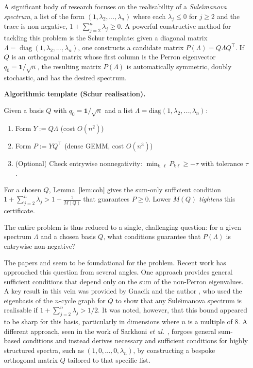 \documentclass[12pt,fleqn]{amsart}
\renewcommand{\le}{\leqslant}
\renewcommand{\ge}{\geqslant}
\theoremstyle{definition}
\theoremstyle{remark}
\newcommand{\1}{\mathbf{1}}
\begin{document}
A significant body of research focuses on the realisability of a \emph{Sule\u{\i}manova spectrum}, a list of the form $(1, \lambda_2, \dots, \lambda_n)$ where each $\lambda_j \le 0$ for $j \ge 2$ and the trace is non-negative, $1 + \sum_{j=2}^n \lambda_j \ge 0$. A powerful constructive method for tackling this problem is the Schur template: given a diagonal matrix $\Lambda = \operatorname{diag}(1, \lambda_2, \dots, \lambda_n)$, one constructs a candidate matrix $P(\Lambda) = Q\Lambda Q^\top$. If $Q$ is an orthogonal matrix whose first column is the Perron eigenvector $q_0 = \mathbf{1}/\sqrt{n}$, the resulting matrix $P(\Lambda)$ is automatically symmetric, doubly stochastic, and has the desired spectrum. 
\medskip

\noindent\textbf{Algorithmic template (Schur realisation).}

Given a basis $Q$ with $q_0=\1/\sqrt n$ and a list $\Lambda=\mathrm{diag}(1,\lambda_2,\ldots,\lambda_n)$:
\begin{enumerate}[leftmargin=*,itemsep=1pt]
\item Form $Y:=Q\Lambda$ \hfill (cost $O(n^2)$)
\item Form $P:=YQ^\top$ \hfill (dense GEMM, cost $O(n^3)$)
\item (Optional) Check entrywise nonnegativity: $\min_{k,\ell}P_{k\ell}\ge -\tau$ with tolerance $\tau$.
\end{enumerate}
For a chosen $Q$, Lemma~\ref{lem:coh} gives the sum-only sufficient condition $1+\sum_{j=2}^n\lambda_j>1-\tfrac{1}{M(Q)}$ that guarantees $P\ge0$. Lower $M(Q)$ \emph{tightens} this certificate.
\medskip

The entire problem is thus reduced to a single, challenging question: for a given spectrum $\Lambda$ and a chosen basis $Q$, what conditions guarantee that $P(\Lambda)$ is entrywise non-negative?\smallskip

The papers \cite{Perfect} and \cite{PM65} seem to be foundational for the problem. Recent work has approached this question from several angles. One approach provides general sufficient conditions that depend only on the sum of the non-Perron eigenvalues. A key result in this vein was provided by Gnacik and the author \cite{GK20}, who used the eigenbasis of the $n$-cycle graph for $Q$ to show that any Sule\u{\i}manova spectrum is realisable if $1 + \sum_{j=2}^n \lambda_j > 1/2$. It was noted, however, that this bound appeared to be sharp for this basis, particularly in dimensions where $n$ is a multiple of 8. A different approach, seen in the work of Sarkhoni \emph{et al}.~\cite{Sarkhoni25}, forgoes general sum-based conditions and instead derives necessary and sufficient conditions for highly structured spectra, such as $(1, 0, \dots, 0, \lambda_n)$, by constructing a bespoke orthogonal matrix $Q$ tailored to that specific list.\smallskip
\end{document}

